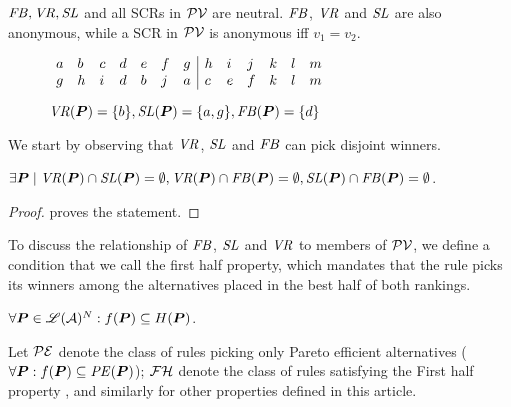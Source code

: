 \documentclass[version=3.21, pagesize, twoside=off, bibliography=totoc, DIV=calc, fontsize=12pt, a4paper]{scrartcl}
\begin{document}
\begin{remark}
     $\mathit{FB}, \mathit{VR}, \mathit{SL}$ and all SCRs in $\mathcal{PV}$ are  neutral. $\mathit{FB}$, $\mathit{VR}$ and $\mathit{SL}$ are also anonymous, while a SCR in $\mathcal{PV}$ is anonymous iff $v_1 = v_2$.
\end{remark}

\begin{figure}
        \caption{$\mathit{VR}(\bm{P}) = \{b\}, \mathit{SL}(\bm{P}) = \{a, g\}, \mathit{FB}(\bm{P}) = \{d\}$}
        \label{fig:disjoint}
        $\begin{array}{llll lll | llll ll}
                a&b&c&d&e&f&g&h&i&j&k&l&m\\
                g&h&i&d&b&j&a&c&e&f&k&l&m\\
        \end{array}$
\end{figure}

We start by observing that $\mathit{VR}$, $\mathit{SL}$ and $\mathit{FB}$ can pick disjoint winners.
\begin{proposition}
	$\exists \prof \suchthat \VR(\prof) \cap \SL(\prof) = \emptyset, \VR(\prof) \cap \FB(\prof) = \emptyset, \SL(\prof) \cap \FB(\prof) = \emptyset$.
\end{proposition}
\begin{proof}
	 proves the statement.
\end{proof}

To discuss the relationship of $\mathit{FB}$, $\mathit{SL}$ and $\mathit{VR}$ to members of $\mathcal{PV}$, we define a condition that we call the first half property, which mandates that the rule picks its winners among the alternatives placed in the best half of both rankings.
\begin{definition}
	$\forall \bm{P} \in \mathscr{L}(\mathcal{A})^N: f(\bm{P}) \subseteq H(\bm{P})$.
\end{definition}
Let $\mathcal{PE}$ denote the class of rules picking only Pareto efficient alternatives ($\forall \bm{P}: f(\bm{P}) \subseteq \mathit{PE}(\bm{P})$); $\mathcal{FH}$ denote the class of rules satisfying the First half property , and similarly for other properties defined in this article.
\end{document}
